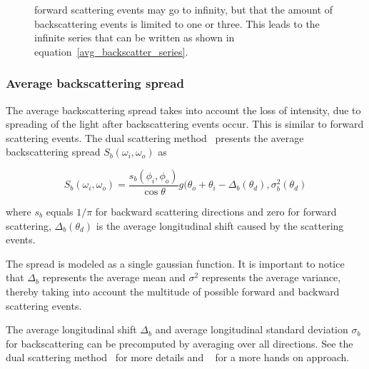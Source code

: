 \begin{figure}
{    forward scattering events may go to infinity, but that the amount of backscattering events is limited to one or three. This leads to the infinite series that can be written as shown in equation~\ref{avg_backscatter_series}.}
    \label{avg_backscatter_attenuation}
\end{figure}

\subsubsection{Average backscattering spread}

The average backscattering spread takes into account the loss of intensity, due to spreading of the light after backscattering events occur. This is similar to forward scattering events. The dual scattering method~\cite{zinke} presents the average backscattering spread $S_b(\omega_i, \omega_o)$ as

\begin{equation}
S_b(\omega_i, \omega_o) = \frac{s_b(\phi_i, \phi_o)}{\cos \theta} g(\theta_o + \theta_i - \Delta_b(\theta_d), \sigma_b^2(\theta_d)
\end{equation}

where $s_b$ equals $1/\pi$ for backward scattering directions and zero for forward scattering, $\Delta_b(\theta_d)$ is the average longitudinal shift caused by the scattering events.

The spread is modeled as a single gaussian function. It is important to notice that $\Delta_b$ represents the average mean and $\sigma^2$ represents the average variance, thereby taking into account the multitude of possible forward and backward scattering events.

The average longitudinal shift $\Delta_b$ and average longitudinal standard deviation $\sigma_b$ for backscattering can be precomputed by averaging over all directions. See the dual scattering method~\cite{zinke} for more details and ~\cite{sadeghi} for a more hands on approach.






